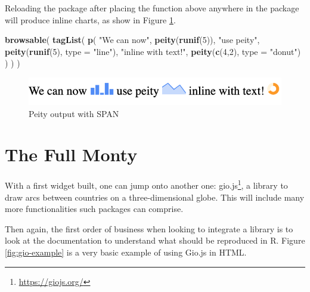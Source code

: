 \documentclass[10pt,]{krantz}
\makeatletter
\newenvironment{Shaded}{\begin{snugshade}}{\end{snugshade}}
\newcommand{\DataTypeTok}[1]{\textcolor[rgb]{0.27,0.27,0.27}{#1}}
\newcommand{\DecValTok}[1]{\textcolor[rgb]{0.06,0.06,0.06}{#1}}
\newcommand{\KeywordTok}[1]{\textcolor[rgb]{0.27,0.27,0.27}{\textbf{#1}}}
\newcommand{\NormalTok}[1]{#1}
\newcommand{\StringTok}[1]{\textcolor[rgb]{0.5,0.5,0.5}{#1}}
\renewcommand{\href}[2]{#2\footnote{\url{#1}}}
\newenvironment{kframe}{%
\medskip{}
\setlength{\fboxsep}{.8em}
 \def\at@end@of@kframe{}%
 \ifinner\ifhmode%
  \def\at@end@of@kframe{\end{minipage}}%
  \begin{minipage}{\columnwidth}%
 \fi\fi%
 \def\FrameCommand##1{\hskip\@totalleftmargin \hskip-\fboxsep
 \colorbox{shadecolor}{##1}\hskip-\fboxsep
     \hskip-\linewidth \hskip-\@totalleftmargin \hskip\columnwidth}%
 \MakeFramed {\advance\hsize-\width
   \@totalleftmargin\z@ \linewidth\hsize
   \@setminipage}}%
 {\par\unskip\endMakeFramed%
 \at@end@of@kframe}
\renewenvironment{Shaded}{\begin{kframe}}{\end{kframe}}
\makeatother
\begin{document}
Reloading the package after placing the function above anywhere in the package will produce inline charts, as show in Figure \ref{fig:peity-spans}.

\begin{Shaded}
\begin{Highlighting}[]
\KeywordTok{browsable}\NormalTok{(}
  \KeywordTok{tagList}\NormalTok{(}
    \KeywordTok{p}\NormalTok{(}
      \StringTok{"We can now"}\NormalTok{, }\KeywordTok{peity}\NormalTok{(}\KeywordTok{runif}\NormalTok{(}\DecValTok{5}\NormalTok{)),}
      \StringTok{"use peity"}\NormalTok{, }\KeywordTok{peity}\NormalTok{(}\KeywordTok{runif}\NormalTok{(}\DecValTok{5}\NormalTok{), }\DataTypeTok{type =} \StringTok{"line"}\NormalTok{),}
      \StringTok{"inline with text!"}\NormalTok{,}
      \KeywordTok{peity}\NormalTok{(}\KeywordTok{c}\NormalTok{(}\DecValTok{4}\NormalTok{,}\DecValTok{2}\NormalTok{), }\DataTypeTok{type =} \StringTok{"donut"}\NormalTok{)}
\NormalTok{    )}
\NormalTok{  )}
\NormalTok{)}
\end{Highlighting}
\end{Shaded}

\begin{figure}[H]

{\centering \includegraphics[width=1\linewidth]{images/peity-span} 

}

\caption{Peity output with SPAN}\label{fig:peity-spans}
\end{figure}

\hypertarget{widgets-full}{%
\chapter{The Full Monty}\label{widgets-full}}

With a first widget built, one can jump onto another one: \href{https://giojs.org/}{gio.js}, a library to draw arcs between countries on a three-dimensional globe. This will include many more functionalities such packages can comprise.

Then again, the first order of business when looking to integrate a library is to look at the documentation to understand what should be reproduced in R. Figure \ref{fig:gio-example} is a very basic example of using Gio.js in HTML.
\end{document}
